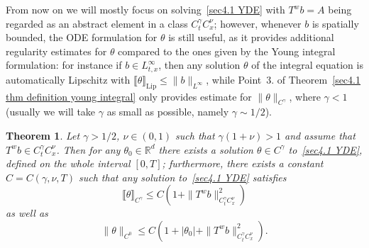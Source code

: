 \documentclass[10pt]{article}
\newcommand{\comma}{{,}}
\newcommand{\tmop}[1]{\ensuremath{\operatorname{#1}}}
\newtheorem{theorem}{Theorem}
\begin{document}
\begin{remark}
  From now on we will mostly focus on solving~{\eqref{sec4.1 YDE}} with $T^w b
  = A$ being regarded as an abstract element in a class $C^{\gamma}_t
  C^{\nu}_x$; however, whenever $b$ is spatially bounded, the ODE formulation
  for $\theta$ is still useful, as it provides additional regularity estimates
  for $\theta$ compared to the ones given by the Young integral formulation:
  for instance if $b \in L^{\infty}_{t, x}$, then any solution $\theta$ of the
  integral equation is automatically Lipschitz with $\llbracket \theta
  \rrbracket_{\tmop{Lip}} \leqslant \| b \|_{L^{\infty}}$, while Point~3. of
  Theorem~\ref{sec4.1 thm definition young integral} only provides estimate
  for $\| \theta \|_{C^{\gamma}}$, where $\gamma < 1$ (usually we will take
  $\gamma$ as small as possible, namely $\gamma \sim 1 / 2$).
\end{remark}

\begin{theorem}
  \label{sec4.1 thm existence YDE}Let $\gamma > 1 / 2$, $\nu \in (0, 1)$ such
  that $\gamma (1 + \nu) > 1$ and assume that $T^w b \in C^{\gamma}_t
  C^{\nu}_x$. Then for any $\theta_0 \in \mathbb{R}^d$ there exists a solution
  $\theta \in C^{\gamma}$ to~{\eqref{sec4.1 YDE}}, defined on the whole
  interval $[0, T]$; furthermore, there exists a constant $C = C (\gamma
  \comma \nu, T)$ such that any solution to~{\eqref{sec4.1 YDE}} satisfies
  \begin{equation}
    \llbracket \theta \rrbracket_{C^{\gamma}} \leqslant C (1 + \| T^w b
    \|_{C^{\gamma}_t C_x^{\nu}}^2) \label{sec4.1 thm existence a priori
    estimate 1}
  \end{equation}
  as well as
  \begin{equation}
    \| \theta \|_{C^0} \leqslant C (1 + | \theta_0 | + \| T^w b
    \|_{C^{\gamma}_t C_x^{\nu}}^2) . \label{sec4.1 thm existence a priori
    estimate 2}
  \end{equation}
\end{theorem}
\end{document}
